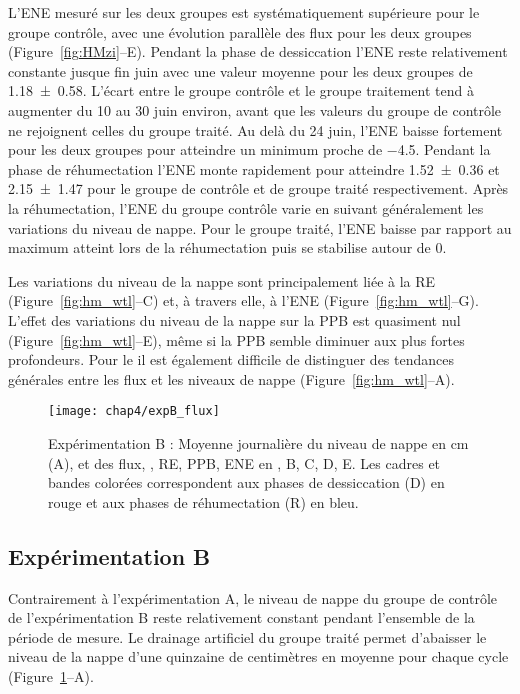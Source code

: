 L'ENE mesuré sur les deux groupes est systématiquement supérieure pour le groupe contrôle, avec une évolution parallèle des flux pour les deux groupes (Figure~\ref{fig:HMzi}--E).
Pendant la phase de dessiccation l'ENE reste relativement constante jusque fin juin avec une valeur moyenne pour les deux groupes de \SI{1.18(058)}{\uml}.
L'écart entre le groupe contrôle et le groupe traitement tend à augmenter du 10 au 30 juin environ, avant que les valeurs du groupe de contrôle ne rejoignent celles du groupe traité.
Au delà du 24 juin, l'ENE baisse fortement pour les deux groupes pour atteindre un minimum proche de \SI{-4.5}{\uml}.
Pendant la phase de réhumectation l'ENE monte rapidement pour atteindre \num{1.52(036)} et \SI{2.15(147)}{\uml} pour le groupe de contrôle et de groupe traité respectivement.
Après la réhumectation, l'ENE du groupe contrôle varie en suivant généralement les variations du niveau de nappe.
Pour le groupe traité, l'ENE baisse par rapport au maximum atteint lors de la réhumectation puis se stabilise autour de 0.

Les variations du niveau de la nappe sont principalement liée à la RE (Figure~\ref{fig:hm_wtl}--C) et, à travers elle, à l'ENE (Figure~\ref{fig:hm_wtl}--G).
L'effet des variations du niveau de la nappe sur la PPB est quasiment nul (Figure~\ref{fig:hm_wtl}--E), même si la PPB semble diminuer aux plus fortes profondeurs.
Pour le \chh il est également difficile de distinguer des tendances générales entre les flux et les niveaux de nappe (Figure~\ref{fig:hm_wtl}--A).

\begin{figure}
\centering
\texttt{[image: chap4/expB\_flux]}
\caption{Expérimentation B : Moyenne journalière du niveau de nappe en cm (A), et des flux, \chh, RE, PPB, ENE en \si{\uml}, B, C, D, E. Les cadres et bandes colorées correspondent aux phases de dessiccation (D) en rouge et aux phases de réhumectation (R) en bleu.}
\label{fig:HMty}
\end{figure}

\subsection{Expérimentation B}

Contrairement à l'expérimentation A, le niveau de nappe du groupe de contrôle de l'expérimentation B reste relativement constant pendant l'ensemble de la période de mesure.
Le drainage artificiel du groupe traité permet d'abaisser le niveau de la nappe d'une quinzaine de centimètres en moyenne pour chaque cycle (Figure~\ref{fig:HMty}--A).


